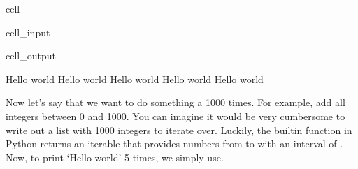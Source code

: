 \documentclass[letterpaper,10pt,english]{jupyterBook}
\begin{document}
\begin{sphinxuseclass}{cell}\begin{sphinxVerbatimInput}

\begin{sphinxuseclass}{cell_input}
\begin{sphinxVerbatim}[commandchars=\\\{\}]
   \PYG{p}{[}    \PYG{p}{]}
\end{sphinxVerbatim}

\end{sphinxuseclass}\end{sphinxVerbatimInput}
\begin{sphinxVerbatimOutput}

\begin{sphinxuseclass}{cell_output}
\begin{sphinxVerbatim}[commandchars=\\\{\}]
Hello world
Hello world
Hello world
Hello world
Hello world
\end{sphinxVerbatim}

\end{sphinxuseclass}\end{sphinxVerbatimOutput}

\end{sphinxuseclass}
\sphinxAtStartPar
Now let’s say that we want to do something a 1000 times. For example, add all integers between 0 and 1000. You can imagine it would be very cumbersome to write out a list with 1000 integers to iterate over. Luckily, the built\sphinxhyphen{}in  function in Python returns an iterable that provides numbers from  to  with an interval of . Now, to print ‘Hello world’ 5 times, we simply use.
\end{document}

